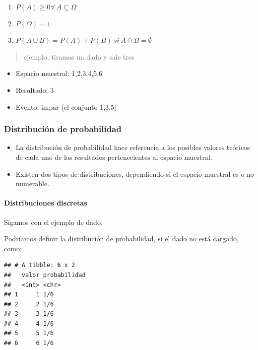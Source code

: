 \documentclass[]{book}
\providecommand{\tightlist}{%
  \setlength{\itemsep}{0pt}\setlength{\parskip}{0pt}}
\let\oldparagraph\paragraph
\renewcommand{\paragraph}[1]{\oldparagraph{#1}\mbox{}}
\begin{document}
\begin{enumerate}
\def\labelenumi{\Alph{enumi})}
\tightlist
\item
  \(P(A) \geq 0 \forall \ A \subseteq \Omega\)
\item
  \(P(\Omega)=1\)
\item
  \(P(A\cup B) = P(A) + P(B)\ si\ A \cap B = \emptyset\)
\end{enumerate}

\begin{quote}
ejemplo, tiramos un dado y sale tres
\end{quote}

\begin{itemize}
\tightlist
\item
  Espacio muestral: 1,2,3,4,5,6
\item
  Resultado: 3
\item
  Evento: impar (el conjunto 1,3,5)
\end{itemize}

\hypertarget{distribucion-de-probabilidad}{%
\subsubsection{Distribución de probabilidad}\label{distribucion-de-probabilidad}}

\begin{itemize}
\item
  La distribución de probabilidad hace referencia a los posibles valores teóricos de cada uno de los resultados pertenecientes al espacio muestral.
\item
  Existen dos tipos de distribuciones, dependiendo si el espacio muestral es o no numerable.
\end{itemize}

\hypertarget{distribuciones-discretas}{%
\paragraph{Distribuciones discretas}\label{distribuciones-discretas}}

Sigamos con el ejemplo de dado.

Podríamos definir la distribución de probabilidad, si el dado no está cargado, como:

\begin{verbatim}
## # A tibble: 6 x 2
##   valor probabilidad
##   <int> <chr>       
## 1     1 1/6         
## 2     2 1/6         
## 3     3 1/6         
## 4     4 1/6         
## 5     5 1/6         
## 6     6 1/6
\end{verbatim}
\end{document}
